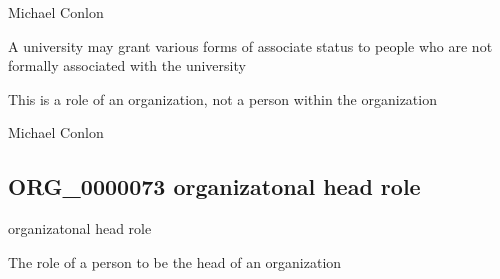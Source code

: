 \documentclass[letterpaper,10pt,english]{sphinxmanual}
\begin{document}
\begin{sphinxShadowBox}

\sphinxAtStartPar
Michael Conlon 
\end{sphinxShadowBox}

\begin{sphinxShadowBox}

\sphinxAtStartPar
A university may grant various forms of associate status to people who are not formally associated with the university
\end{sphinxShadowBox}

\begin{sphinxShadowBox}

\sphinxAtStartPar
This is a role of an organization, not a person within the organization
\end{sphinxShadowBox}

\begin{sphinxShadowBox}

\sphinxAtStartPar
Michael Conlon 
\end{sphinxShadowBox}
\begin{quote}

\ignorespaces \end{quote}


\subsection{ORG\_0000073 \sphinxhyphen{} organizatonal head role}
\label{\detokenize{doc-ORG_0000073:org-0000073-organizatonal-head-role}}\label{\detokenize{doc-ORG_0000073:index-0}}\label{\detokenize{doc-ORG_0000073::doc}}
\begin{sphinxShadowBox}

\sphinxAtStartPar
organizatonal head role
\end{sphinxShadowBox}

\begin{sphinxShadowBox}

\sphinxAtStartPar
The role of a person to be the head of an organization
\end{sphinxShadowBox}
\end{document}
